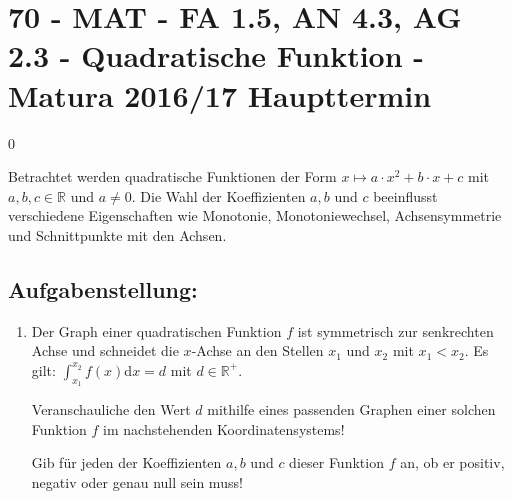 \section{70 - MAT - FA 1.5, AN 4.3, AG 2.3 - Quadratische Funktion - Matura 2016/17 Haupttermin}

\begin{langesbeispiel} \item[0] %
	
Betrachtet werden quadratische Funktionen der Form $x\mapsto a\cdot x^2+b\cdot x+c$ mit $a,b,c\in\mathbb{R}$ und $a\neq 0$. Die Wahl der Koeffizienten $a,b$ und $c$ beeinflusst verschiedene Eigenschaften wie Monotonie, Monotoniewechsel, Achsensymmetrie und Schnittpunkte mit den Achsen.

\subsection{Aufgabenstellung:}
\begin{enumerate}
	\item Der Graph einer quadratischen Funktion $f$ ist symmetrisch zur senkrechten Achse und schneidet die $x$-Achse an den Stellen $x_1$ und $x_2$ mit $x_1<x_2$. Es gilt: $\int^{x_2}_{x_1}{f(x)}$d$x=d$ mit $d\in\mathbb{R}^+$.
	
	Veranschauliche den Wert $d$ mithilfe eines passenden Graphen einer solchen Funktion $f$ im nachstehenden Koordinatensystems!
	
	\begin{center}
	\end{center}
	
	Gib für jeden der Koeffizienten $a,b$ und $c$ dieser Funktion $f$ an, ob er positiv, negativ oder genau null sein muss!\leer
	

\end{enumerate}
\end{langesbeispiel}
